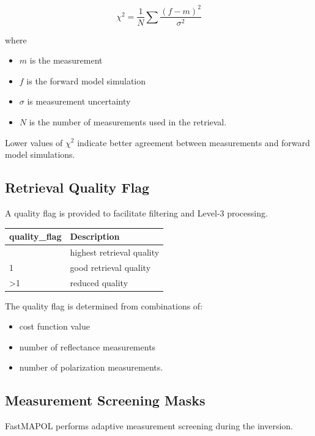 \documentclass[
  letterpaper,
]{scrbook}
\providecommand{\tightlist}{%
  \setlength{\itemsep}{0pt}\setlength{\parskip}{0pt}}
\begin{document}
\[
\chi^2 = \frac{1}{N}\sum \frac{(f-m)^2}{\sigma^2}
\]

where

\begin{itemize}
\tightlist
\item
  \(m\) is the measurement\\
\item
  \(f\) is the forward model simulation
\item
  \(\sigma\) is measurement uncertainty\\
\item
  \(N\) is the number of measurements used in the retrieval.
\end{itemize}

Lower values of \(\chi^2\) indicate better agreement between
measurements and forward model simulations.

\subsection{Retrieval Quality Flag}\label{retrieval-quality-flag}

A quality flag is provided to facilitate filtering and Level-3
processing.

\begin{longtable}[]{@{}ll@{}}
\toprule\noalign{}
quality\_flag & Description \\
\midrule\noalign{}
\endhead
\bottomrule\noalign{}
\endlastfoot
0 & highest retrieval quality \\
1 & good retrieval quality \\
\textgreater1 & reduced quality \\
\end{longtable}

The quality flag is determined from combinations of:

\begin{itemize}
\tightlist
\item
  cost function value
\item
  number of reflectance measurements
\item
  number of polarization measurements.
\end{itemize}

\subsection{Measurement Screening
Masks}\label{measurement-screening-masks}

FastMAPOL performs adaptive measurement screening during the inversion.
\end{document}
